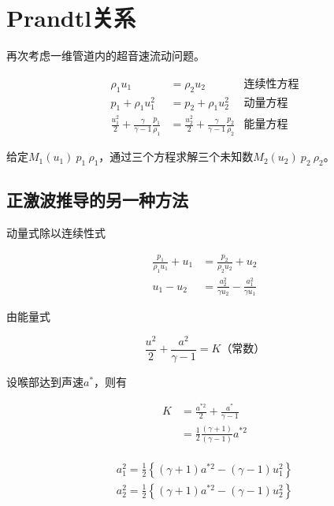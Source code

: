 \section{Prandtl关系}

再次考虑一维管道内的超音速流动问题。

\begin{align*}
    \rho_{1} u_{1}&=\rho_{2} u_{2} &\mbox{连续性方程}\\ 
    p_{1}+\rho_{1} u_{1}^{2}&=p_{2}+\rho_{1} u_{2}^{2}&\mbox{动量方程}\\ 
    \frac{u_{1}^{2}}{2}+\frac{\gamma}{\gamma-1} \frac{p_{1}}{\rho_{1}}&=\frac{u_{2}^{2}}{2}+\frac{\gamma}{\gamma-1} \frac{p_{2}}{\rho_{2}}&\mbox{能量方程}
\end{align*}

给定$M_1(u_1)\ p_1\ \rho_1$，通过三个方程求解三个未知数$M_2(u_2)\ p_2\ \rho_2$。

\subsection{正激波推导的另一种方法}

动量式除以连续性式

\begin{align*}
    \frac{p_{1}}{\rho_{1} u_{1}}+u_{1}&=\frac{p_{2}}{\rho_{2} u_{2}}+u_{2}\\ 
    u_{1}-u_{2}&=\frac{a_{2}^{2}}{\gamma u_{2}}-\frac{a_{1}^{2}}{\gamma u_{1}}
\end{align*}

由能量式

\begin{equation*}
    \frac{u^{2}}{2}+\frac{a^{2}}{\gamma-1}=K\mbox{（常数）}
\end{equation*}

设喉部达到声速$a^{*}$，则有

\begin{align*}
    K&=\frac{a^{* 2}}{2}+\frac{a^{*}}{\gamma-1}\\ 
    &=\frac{1}{2} \frac{(\gamma+1)}{(\gamma-1)} a^{* 2}
\end{align*}

\begin{align*}
\begin{array}{l}{a_{1}^{2}=\frac{1}{2}\left\{(\gamma+1) a^{* 2}-(\gamma-1) u_{1}^{2}\right\}} \\ {a_{2}^{2}=\frac{1}{2}\left\{(\gamma+1) a^{* 2}-(\gamma-1) u_{2}^{2}\right\}}\end{array}
\end{align*}

